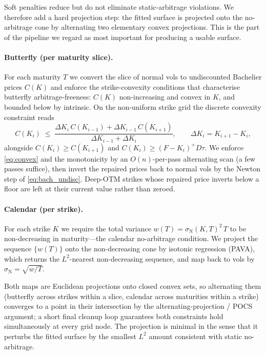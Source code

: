 \documentclass[11pt]{article}
\newcommand{\Fwd}{F}
\newcommand{\Nvol}{\sigma_{\mathrm N}}
\theoremstyle{plain}
\theoremstyle{definition}
\begin{document}
Soft penalties reduce but do not eliminate static-arbitrage violations. We
therefore add a hard projection step: the fitted surface is projected onto the
no-arbitrage cone by alternating two elementary convex projections. This is the
part of the pipeline we regard as most important for producing a usable surface.

\paragraph{Butterfly (per maturity slice).}
For each maturity $T$ we convert the slice of normal vols to undiscounted
Bachelier prices $C(K)$ and enforce the strike-convexity conditions that
characterise butterfly arbitrage-freeness: $C(K)$ non-increasing and convex in
$K$, and bounded below by intrinsic. On the non-uniform strike grid the discrete
convexity constraint reads
\begin{equation}
C(K_i) \;\le\; \frac{\Delta K_i\, C(K_{i-1}) + \Delta K_{i-1}\, C(K_{i+1})}
                    {\Delta K_{i-1} + \Delta K_i},
\qquad \Delta K_i = K_{i+1} - K_i,
\label{eq:convex}
\end{equation}
alongside $C(K_i)\ge C(K_{i+1})$ and $C(K_i)\ge (\Fwd-K_i)^+ D\tau$. We enforce
\eqref{eq:convex} and the monotonicity by an $O(n)$-per-pass alternating scan
(a few passes suffice), then invert the repaired prices back to normal vols by
the Newton step of \eqref{eq:bach_undisc}. Deep-OTM strikes whose repaired price
inverts below a floor are left at their current value rather than zeroed.

\paragraph{Calendar (per strike).}
For each strike $K$ we require the total variance $w(T) = \Nvol(K,T)^2\,T$ to be
non-decreasing in maturity---the calendar no-arbitrage condition. We project the
sequence $\{w(T)\}$ onto the non-decreasing cone by isotonic regression (PAVA),
which returns the $L^2$-nearest non-decreasing sequence, and map back to vols by
$\Nvol = \sqrt{w/T}$.

Both maps are Euclidean projections onto closed convex sets, so alternating them
(butterfly across strikes within a slice, calendar across maturities within a
strike) converges to a point in their intersection by the alternating-projection
/ POCS argument; a short final cleanup loop guarantees both constraints hold
simultaneously at every grid node. The projection is minimal in the sense that
it perturbs the fitted surface by the smallest $L^2$ amount consistent with
static no-arbitrage.
\end{document}
